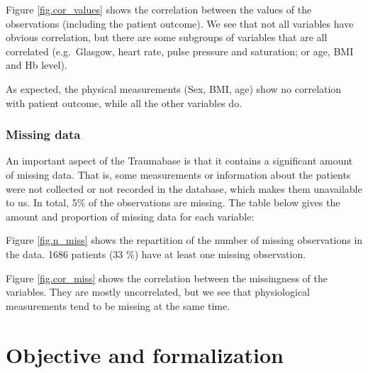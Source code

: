 Figure \ref{fig.cor_values} shows the correlation between the values of the observations (including the patient outcome). We see that not all variables have obvious correlation, but there are some subgroups of variables that are all correlated (e.g.\ Glasgow, heart rate, pulse pressure and saturation; or age, BMI and Hb level). 

As expected, the physical measurements (Sex, BMI, age) show no correlation with patient outcome, while all the other variables do. 

			\subsubsection{Missing data}
			
An important aspect of the Traumabase is that it contains a significant amount of missing data. That is, some measurements or information about the patients were not collected or not recorded in the database, which makes them unavailable to us. In total, 5\% of the observations are missing. The table below gives the amount and proportion of missing data for each variable:



Figure \ref{fig.n_miss} shows the repartition of the number of missing observations in the data. 1686 patients (33 \%) have at least one missing observation.


			
Figure \ref{fig.cor_miss} shows the correlation between the missingness of the variables. They are mostly uncorrelated, but we see that physiological measurements tend to be missing at the same time.



%



	\section{Objective and formalization}
